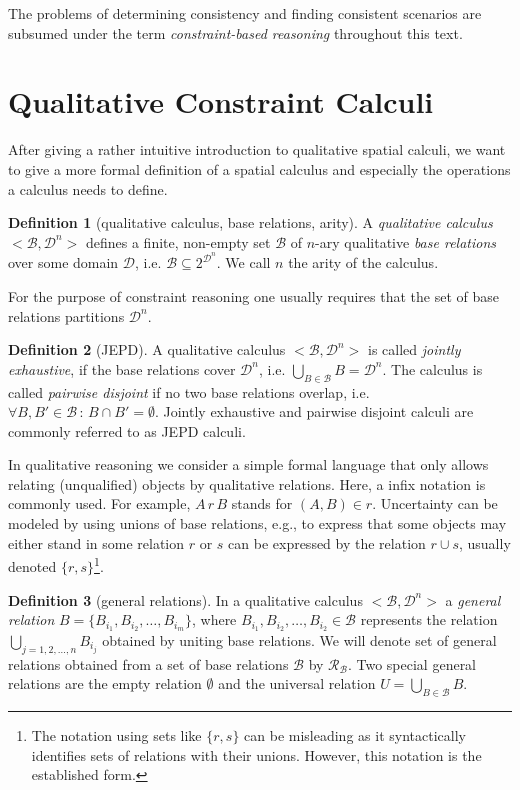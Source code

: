 \documentclass[headsepline]{scrreprt}
\theoremstyle{definition}
\newtheorem{defn}{Definition}
\begin{document}
The problems of determining consistency and finding consistent
scenarios are subsumed under the term
\emph{constraint-based reasoning} throughout this
text.

\section{Qualitative Constraint Calculi}

After giving a rather intuitive introduction to
qualitative spatial calculi, we want to give a more
formal definition of a spatial calculus and especially
the operations a calculus needs to define.

\begin{defn}[qualitative calculus, base relations, arity]
	A {\em qualitative calculus} $<\mathcal{B}, \mathcal{D}^n>$ defines a finite, non-empty set $\mathcal{B}$ of $n$-ary qualitative {\em base relations} over some domain $\mathcal{D}$, i.e. $\mathcal{B} \subseteq 2^{\mathcal{D}^n}$.
	We call $n$ the arity of the calculus.
\end{defn}

For the purpose of constraint reasoning one usually requires that the set of base relations
partitions $\mathcal{D}^n$.

\begin{defn}[JEPD]
	A qualitative calculus $<\mathcal{B}, \mathcal{D}^n>$ is called {\em jointly exhaustive}, if the base relations cover $\mathcal{D}^n$, i.e. $\bigcup_{B\in \mathcal{B}} B = \mathcal{D}^n$. The calculus is called {\em pairwise disjoint} if no two base relations overlap, i.e. $\forall B,B' \in \mathcal{B} \, :\, B \cap B' = \emptyset$. Jointly exhaustive and pairwise disjoint calculi are commonly referred to as JEPD calculi.
\end{defn}


In qualitative reasoning we consider a simple formal language that only allows relating (unqualified) objects by qualitative relations. Here, a infix notation is commonly used. For example, $A\, r\, B$ stands for $(A,B) \in r$. Uncertainty can be modeled by using
unions of base relations, e.g., to express that some objects may either stand in some relation $r$ or $s$ can be expressed by the relation $r \cup s$, usually denoted $\{r,s\}$\footnote{The notation using sets like $\{r,s\}$ can be misleading as it syntactically identifies sets of relations with their unions. However, this notation is the established form.}.

\begin{defn}[general relations]
	In a qualitative calculus $<\mathcal{B}, \mathcal{D}^n>$ a {\em general relation} $B =\{ B_{i_{1}}, B_{i_{2}}, \ldots, B_{i_{m}}\}$, where  $B_{i_{1}}, B_{i_{2}}, \ldots, B_{i_{2}} \in \mathcal{B}$ represents the relation $\bigcup_{j=1,2,\ldots,n} B_{i_{j}}$ obtained by uniting base relations. We will denote set of general relations obtained from a set of base relations $\mathcal{B}$ by $\mathcal{R}_{\mathcal{B}}$.
	Two special general relations are the empty relation $\emptyset$ and the universal relation $U=\bigcup_{B\in \mathcal{B}} B$.
\end{defn}
\end{document}
